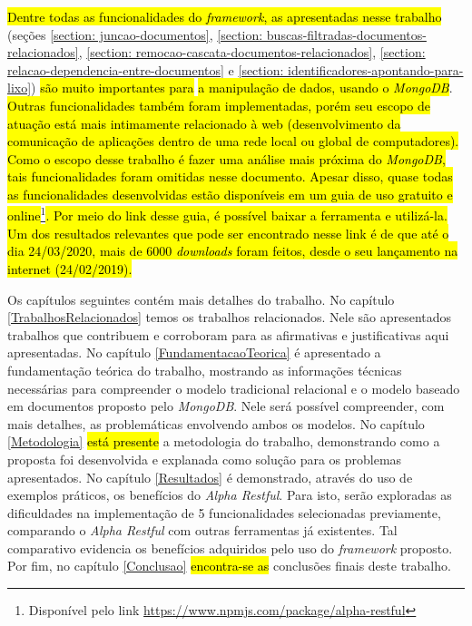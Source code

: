 \hl{Dentre todas as funcionalidades do \textit{framework}, as apresentadas nesse trabalho} (seções \ref{section: juncao-documentos}, \ref{section: buscas-filtradas-documentos-relacionados}, \ref{section: remocao-cascata-documentos-relacionados}, \ref{section: relacao-dependencia-entre-documentos} e \ref{section: identificadores-apontando-para-lixo}) \hl{são muito importantes para} \hl{a manipulação de dados, usando o \textit{MongoDB}}. \hl{Outras funcionalidades também foram implementadas, porém seu escopo de atuação está mais intimamente relacionado à web (desenvolvimento da comunicação de aplicações dentro de uma rede local ou global de computadores). Como o escopo desse trabalho é fazer uma análise mais próxima do \textit{MongoDB}, tais funcionalidades foram omitidas nesse documento. Apesar disso, quase todas as funcionalidades desenvolvidas estão disponíveis em um guia de uso gratuito e online}\footnote{Disponível pelo link \url{https://www.npmjs.com/package/alpha-restful}}\hl{. Por meio do link desse guia, é possível baixar a ferramenta e utilizá-la. Um dos resultados relevantes que pode ser encontrado nesse link é de que até o dia 24/03/2020, mais de 6000 \textit{downloads} foram feitos, desde o seu lançamento na internet (24/02/2019).}


Os capítulos seguintes contém mais detalhes do trabalho. No capítulo \ref{TrabalhosRelacionados} temos os trabalhos relacionados. Nele são apresentados trabalhos que contribuem e corroboram para as afirmativas e justificativas aqui apresentadas. No capítulo \ref{FundamentacaoTeorica} é apresentado a fundamentação teórica do trabalho, mostrando as informações técnicas necessárias para compreender o modelo tradicional relacional e o modelo baseado em documentos proposto pelo \textit{MongoDB}. Nele será possível compreender, com mais detalhes, as problemáticas envolvendo ambos os modelos. \hl{ } No capítulo \ref{Metodologia} \hl{está presente} a metodologia do trabalho, demonstrando como a proposta foi desenvolvida e explanada como solução para os problemas apresentados. No capítulo \ref{Resultados} é demonstrado, através do uso de exemplos práticos, os benefícios do \textit{Alpha Restful}. Para isto, serão exploradas as dificuldades na implementação de 5 funcionalidades selecionadas previamente, comparando o \textit{Alpha Restful} com outras ferramentas já existentes. Tal comparativo evidencia os benefícios adquiridos pelo uso do \textit{framework} proposto. Por fim, no capítulo \ref{Conclusao} \hl{encontra-se as} conclusões finais deste trabalho.

